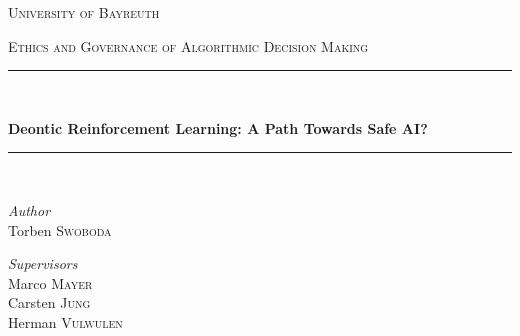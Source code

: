 \documentclass[12pt]{article}
\begin{document}


\begin{titlepage}

\newcommand{\HRule}{\rule{\linewidth}{0.5mm}} %

\center %
 

\textsc{\LARGE University of Bayreuth}\\[0.5cm] %
\begin{spacing}{1.8}
\textsc{\Large Ethics and Governance of Algorithmic Decision Making}\\[0.5cm] %
\end{spacing}


\HRule \\[0.4cm]
\begin{spacing}{2.3}
{ \huge \bfseries
Deontic Reinforcement Learning: A Path Towards Safe AI?}\\ \end{spacing} %
\HRule \\[1.5cm]

\begin{minipage}[c][2cm][t]{0.4\textwidth} %
\begin{flushleft} \large
\emph{Author}\\
Torben \textsc{Swoboda} \\%
\end{flushleft}
\end{minipage}
\begin{minipage}[c][2cm][t]{0.4\textwidth} %
\begin{flushright} \large
\emph{Supervisors} \\
Marco \textsc{Mayer}\\
Carsten \textsc{Jung}\\
Herman \textsc{Vulwulen} %
\end{flushright}
\end{minipage}\\[3.cm]


\end{titlepage}
\end{document}
